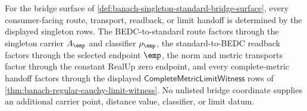 \begin{lemma}
\label{lem:banach-singleton-standard-bridge-determinacy}
For the bridge surface of
\autoref{def:banach-singleton-standard-bridge-surface}, every consumer-facing
route, transport, readback, or limit handoff is determined by the displayed
singleton rows. The BEDC-to-standard route factors through the singleton carrier
$A_{\emp}$ and classifier $\rho_{\emp}$, the standard-to-BEDC readback factors
through the selected endpoint $\emp$, the norm and metric transports factor
through the constant RealUp zero endpoint, and every complete-metric handoff
factors through the displayed
$\mathsf{CompleteMetricLimitWitness}$ rows of
\autoref{thm:banach-regular-cauchy-limit-witness}. No unlisted bridge
coordinate supplies an additional carrier point, distance value, classifier, or
limit datum.
\end{lemma}
